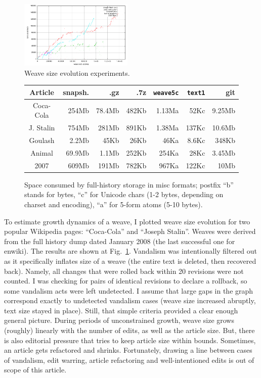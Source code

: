 \documentclass{acm_proc_article-sp}
\begin{document}
\begin{figure} 
\includegraphics[width=0.48\textwidth]{weave-growth.pdf}
\caption{Weave size evolution experiments.} \label{fig:weave}
\end{figure}
\begin{figure} 
\resizebox{0.48\textwidth}{!} {
\begin{tabular}{|c|r|r|r|r|r|r|}
\hline
Article & snapsh. & .gz & .7z & {\tt weave5c} & {\tt text1} & git \\
\hline
Coca-Cola& 254Mb &78.4Mb & 482Kb & 1.13Ma & 52Kc & 9.25Mb\\
J. Stalin&754Mb& 281Mb&891Kb& 1.38Ma&137Kc& 10.6Mb\\
Goulash&2.2Mb&45Kb&26Kb&46Ka&8.6Kc& 348Kb\\
Animal & 69.9Mb & 1.1Mb & 252Kb & 254Ka & 28Kc & 3.45Mb\\
2007 & 609Mb & 191Mb & 782Kb & 967Ka & 122Kc & 10Mb\\
\hline
\end{tabular}
}
\caption{Space consumed by full-history storage in misc formats; postfix ``b'' stands for bytes, ``c'' for Unicode chars (1-2 bytes, depending on charset and encoding), ``a'' for 5-form atoms (5-10 bytes).} \label{fig:sizes} %
\end{figure}

To estimate growth dynamics of a weave, I plotted weave size evolution for two popular Wikipedia pages: ``Coca-Cola'' and ``Joseph Stalin''.
Weaves were derived from the full history dump dated January 2008 (the last successful one for enwiki).
The results are shown at Fig.~\ref{fig:weave}.
Vandalism was intentionally filtered out as it specifically inflates size of a weave (the entire text is deleted, then recovered back).
Namely, all changes that were rolled back within 20 revisions were  not counted.
I was checking for pairs of identical revisions to declare a rollback, so some vandalism acts were left undetected.
I assume that large gaps in the graph correspond exactly to undetected vandalism cases (weave size increased abruptly, text size stayed in place).
Still, that simple criteria provided a clear enough general picture.
During periods of unconstrained growth, weave size grows (roughly) linearly with the number of edits, as well as the article size.
But, there is also editorial pressure that tries to keep article size within bounds. Sometimes, an article gets refactored and shrinks.
Fortunately, drawing a line between cases of vandalism, edit warring, article refactoring and well-intentioned edits is out of scope of this article.
\end{document}
